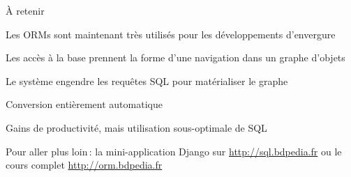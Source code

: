 \begin{frame}{À retenir}

Les ORMs sont maintenant très utilisés pour les développements d'envergure
\vfill

\begin{redbullet}
  \item Les accès à la base prennent la forme d'une navigation dans un graphe d'objets
  \item Le système engendre les requêtes SQL pour matérialiser le graphe
  \item Conversion entièrement automatique
  \item Gains de productivité, \alert{mais} utilisation sous-optimale de SQL
\end{redbullet}

\vfill

\begin{blocgauche}
Pour aller plus loin\,: la mini-application Django sur \url{http://sql.bdpedia.fr}
ou le cours complet \url{http://orm.bdpedia.fr}
\end{blocgauche}
\end{frame}

